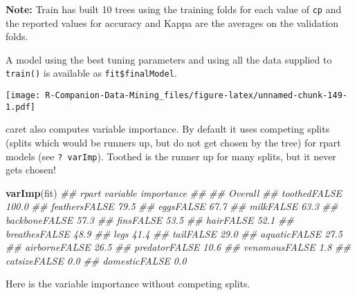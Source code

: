 \documentclass[
  notitlepage]{book}
\newenvironment{Shaded}{\begin{snugshade}}{\end{snugshade}}
\newcommand{\CommentTok}[1]{\textcolor[rgb]{0.56,0.35,0.01}{\textit{#1}}}
\newcommand{\DataTypeTok}[1]{\textcolor[rgb]{0.13,0.29,0.53}{#1}}
\newcommand{\DecValTok}[1]{\textcolor[rgb]{0.00,0.00,0.81}{#1}}
\newcommand{\KeywordTok}[1]{\textcolor[rgb]{0.13,0.29,0.53}{\textbf{#1}}}
\newcommand{\NormalTok}[1]{#1}
\newcommand{\OperatorTok}[1]{\textcolor[rgb]{0.81,0.36,0.00}{\textbf{#1}}}
\newcommand{\StringTok}[1]{\textcolor[rgb]{0.31,0.60,0.02}{#1}}
\begin{document}
\textbf{Note:} Train has built 10 trees using the training folds for each
value of \texttt{cp} and the reported values for accuracy and Kappa are the
averages on the validation folds.

A model using the best tuning parameters and using all the data supplied
to \texttt{train()} is available as \texttt{fit\$finalModel}.

\begin{Shaded}
\end{Shaded}

\texttt{[image: R-Companion-Data-Mining\_files/figure-latex/unnamed-chunk-149-1.pdf]}

caret also computes variable importance. By default it uses competing
splits (splits which would be runners up, but do not get chosen by the
tree) for rpart models (see \texttt{?\ varImp}). Toothed is the runner up for
many splits, but it never gets chosen!

\begin{Shaded}
\begin{Highlighting}[]
\KeywordTok{varImp}\NormalTok{(fit)}
\CommentTok{\#\# rpart variable importance}
\CommentTok{\#\# }
\CommentTok{\#\#               Overall}
\CommentTok{\#\# toothedFALSE    100.0}
\CommentTok{\#\# feathersFALSE    79.5}
\CommentTok{\#\# eggsFALSE        67.7}
\CommentTok{\#\# milkFALSE        63.3}
\CommentTok{\#\# backboneFALSE    57.3}
\CommentTok{\#\# finsFALSE        53.5}
\CommentTok{\#\# hairFALSE        52.1}
\CommentTok{\#\# breathesFALSE    48.9}
\CommentTok{\#\# legs             41.4}
\CommentTok{\#\# tailFALSE        29.0}
\CommentTok{\#\# aquaticFALSE     27.5}
\CommentTok{\#\# airborneFALSE    26.5}
\CommentTok{\#\# predatorFALSE    10.6}
\CommentTok{\#\# venomousFALSE     1.8}
\CommentTok{\#\# catsizeFALSE      0.0}
\CommentTok{\#\# domesticFALSE     0.0}
\end{Highlighting}
\end{Shaded}

Here is the variable importance without competing splits.
\end{document}
